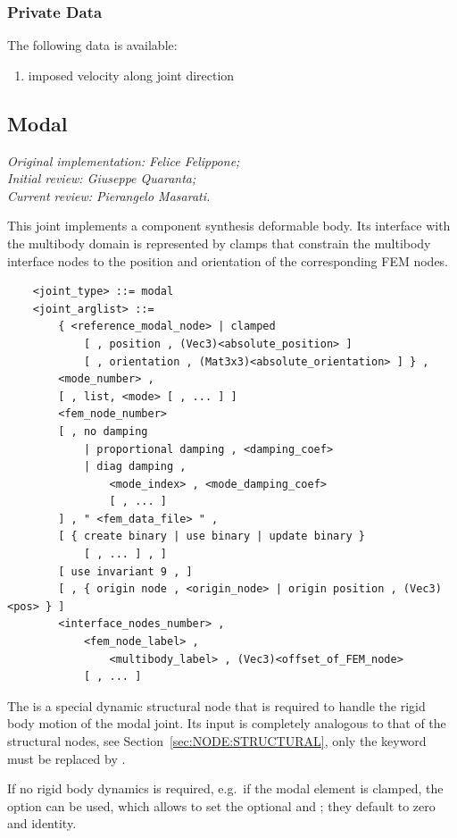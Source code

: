 \subsubsection{Private Data}
The following data is available:
\begin{enumerate}
\item {} imposed velocity along joint direction
\end{enumerate}

\subsection{Modal}\label{sec:EL:STRUCT:JOINT:MODAL}
\emph{
Original implementation: Felice Felippone; \\
Initial review: Giuseppe Quaranta; \\
Current review: Pierangelo Masarati.}

This joint implements a component synthesis deformable body.
Its interface with the multibody domain is represented by clamps
that constrain the multibody interface nodes to the position
and orientation of the corresponding FEM nodes.

\begin{verbatim}
    <joint_type> ::= modal
    <joint_arglist> ::=
        { <reference_modal_node> | clamped
            [ , position , (Vec3)<absolute_position> ]
            [ , orientation , (Mat3x3)<absolute_orientation> ] } ,
        <mode_number> ,
        [ , list, <mode> [ , ... ] ]
        <fem_node_number> 
        [ , no damping 
            | proportional damping , <damping_coef>
            | diag damping , 
                <mode_index> , <mode_damping_coef> 
                [ , ... ] 
        ] , " <fem_data_file> " ,
        [ { create binary | use binary | update binary }
            [ , ... ] , ]
        [ use invariant 9 , ]
        [ , { origin node , <origin_node> | origin position , (Vec3)<pos> } ]
        <interface_nodes_number> ,
            <fem_node_label> ,
                <multibody_label> , (Vec3)<offset_of_FEM_node>
            [ , ... ]
\end{verbatim}
The  is a special dynamic structural node 
that is required to handle the rigid body motion of the modal joint.
Its input is completely analogous to that of the  structural
nodes, see Section~\ref{sec:NODE:STRUCTURAL}, only the keyword  
must be replaced by .

\noindent
If no rigid body dynamics is required, e.g.\ if the modal element
is clamped, the  option can be used, which allows
to set the optional  
and ; they default to zero and identity.

